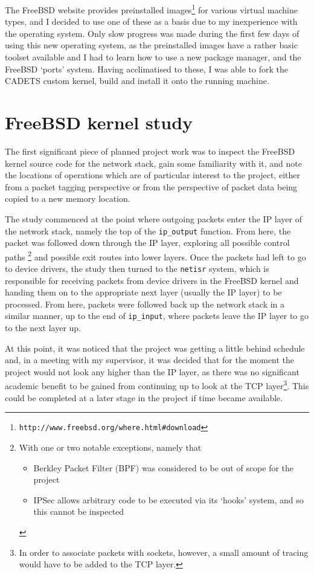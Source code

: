 \documentclass[a4paper,12pt,twoside,openright]{report}
\begin{document}
	The FreeBSD website provides preinstalled images\footnote{\texttt{http://www.freebsd.org/where.html\#download}} for various virtual machine types, and I decided to use one of these as a basis due to my inexperience with the operating system. Only slow progress was made during the first few days of using this new operating system, as the preinstalled images have a rather basic toolset available and I had to learn how to use a new package manager, and the FreeBSD `ports' system. Having acclimatised to these, I was able to fork the CADETS custom kernel, build and install it onto the running machine.
	
	\section{FreeBSD kernel study}
	
	The first significant piece of planned project work was to inspect the FreeBSD kernel source code for the network stack, gain some familiarity with it, and note the locations of operations which are of particular interest to the project, either from a packet tagging perspective or from the perspective of packet data being copied to a new memory location.
	
	The study commenced at the point where outgoing packets enter the IP layer of the network stack, namely the top of the \verb|ip_output| function. From here, the packet was followed down through the IP layer, exploring all possible control paths
	\footnote{
		With one or two notable exceptions, namely that
		\begin{itemize}
			\item Berkley Packet Filter (BPF) was considered to be out of scope for the project
			\item IPSec allows arbitrary code to be executed via its `hooks' system, and so this cannot be inspected
		\end{itemize}
	}
	and possible exit routes into lower layers. Once the packets had left to go to device drivers, the study then turned to the \texttt{netisr} system, which is responsible for receiving packets from device drivers in the FreeBSD kernel and handing them on to the appropriate next layer (usually the IP layer) to be processed. From here, packets were followed back up the network stack in a similar manner, up to the end of \verb|ip_input|, where packets leave the IP layer to go to the next layer up.
	
	At this point, it was noticed that the project was getting a little behind schedule and, in a meeting with my supervisor, it was decided that for the moment the project would not look any higher than the IP layer, as there was no significant academic benefit to be gained from continuing up to look at the TCP layer\footnote{In order to associate packets with sockets, however, a small amount of tracing would have to be added to the TCP layer.}. This could be completed at a later stage in the project if time became available.
	
\end{document}
